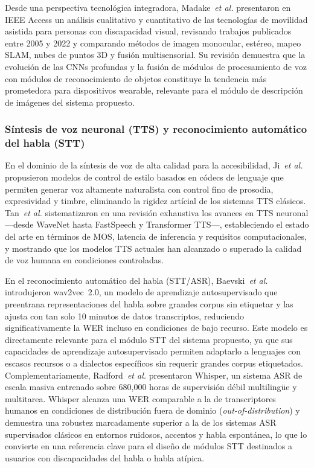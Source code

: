 \documentclass[journal]{IEEEtran}
\begin{document}
	Desde una perspectiva tecnol\'ogica integradora, Madake~\textit{et al.} \cite{madake2023} presentaron en IEEE Access un an\'alisis cualitativo y cuantitativo de las tecnolog\'ias de movilidad asistida para personas con discapacidad visual, revisando trabajos publicados entre 2005 y 2022 y comparando m\'etodos de imagen monocular, est\'ereo, mapeo SLAM, nubes de puntos 3D y fusi\'on multisensorial. Su revisi\'on demuestra que la evoluci\'on de las CNNs profundas y la fusi\'on de m\'odulos de procesamiento de voz con m\'odulos de reconocimiento de objetos constituye la tendencia m\'as prometedora para dispositivos wearable, relevante para el m\'odulo de descripci\'on de im\'agenes del sistema propuesto.
	
	\subsubsection{S\'intesis de voz neuronal (TTS) y reconocimiento autom\'atico del habla (STT)}
	En el dominio de la s\'intesis de voz de alta calidad para la accesibilidad, Ji~\textit{et al.} \cite{ji2024} propusieron modelos de control de estilo basados en c\'odecs de lenguaje que permiten generar voz altamente naturalista con control fino de prosodia, expresividad y timbre, eliminando la rigidez art\'icial de los sistemas TTS cl\'asicos. Tan~\textit{et al.} \cite{tan2021} sistematizaron en una revisi\'on exhaustiva los avances en TTS neuronal ---desde WaveNet hasta FastSpeech y Transformer TTS---, estableciendo el estado del arte en t\'erminos de MOS, latencia de inferencia y requisitos computacionales, y mostrando que los modelos TTS actuales han alcanzado o superado la calidad de voz humana en condiciones controladas.
	
	En el reconocimiento autom\'atico del habla (STT/ASR), Baevski~\textit{et al.} \cite{baevski2020} introdujeron wav2vec~2.0, un modelo de aprendizaje autosupervisado que preentrana representaciones del habla sobre grandes corpus sin etiquetar y las ajusta con tan solo 10 minutos de datos transcriptos, reduciendo significativamente la WER incluso en condiciones de bajo recurso. Este modelo es directamente relevante para el m\'odulo STT del sistema propuesto, ya que sus capacidades de aprendizaje autosupervisado permiten adaptarlo a lenguajes con escasos recursos o a dialectos espec\'ificos sin requerir grandes corpus etiquetados. Complementariamente, Radford~\textit{et al.} \cite{radford2023} presentaron Whisper, un sistema ASR de escala masiva entrenado sobre 680{,}000 horas de supervisi\'on d\'ebil multiling\"ue y multitarea. Whisper alcanza una WER comparable a la de transcriptores humanos en condiciones de distribuci\'on fuera de dominio (\textit{out-of-distribution}) y demuestra una robustez marcadamente superior a la de los sistemas ASR supervisados cl\'asicos en entornos ruidosos, accentos y habla espont\'anea, lo que lo convierte en una referencia clave para el dise\~no de m\'odulos STT destinados a usuarios con discapacidades del habla o habla at\'ipica.
	
\end{document}

